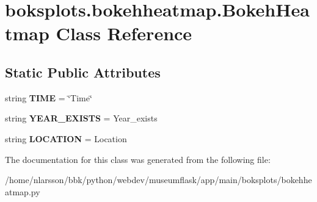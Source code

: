 \hypertarget{classboksplots_1_1bokehheatmap_1_1BokehHeatmap}{}\section{boksplots.\+bokehheatmap.\+Bokeh\+Heatmap Class Reference}
\label{classboksplots_1_1bokehheatmap_1_1BokehHeatmap}
\subsection*{Static Public Attributes}
\begin{DoxyCompactItemize}
\item 
\mbox{\label{classboksplots_1_1bokehheatmap_1_1BokehHeatmap_a26e4597348969c07880f5909a4ba7dce}} 
string {\bfseries T\+I\+ME} = \char`\"{}Time\char`\"{}
\item 
\mbox{\label{classboksplots_1_1bokehheatmap_1_1BokehHeatmap_a3a36f2782c4cf254a7b968deac59cd14}} 
string {\bfseries Y\+E\+A\+R\+\_\+\+E\+X\+I\+S\+TS} = \textquotesingle{}Year\+\_\+exists\textquotesingle{}
\item 
\mbox{\label{classboksplots_1_1bokehheatmap_1_1BokehHeatmap_a15a114a71ad2bf3fe4712b1fb7e42fd5}} 
string {\bfseries L\+O\+C\+A\+T\+I\+ON} = \textquotesingle{}Location\textquotesingle{}
\end{DoxyCompactItemize}


The documentation for this class was generated from the following file\+:\begin{DoxyCompactItemize}
\item 
/home/nlarsson/bbk/python/webdev/museumflask/app/main/boksplots/bokehheatmap.\+py\end{DoxyCompactItemize}
